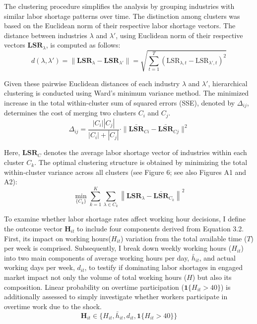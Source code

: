 \documentclass[
  12pt,
]{article}
\begin{document}
The clustering procedure simplifies the analysis by grouping industries
with similar labor shortage patterns over time. The distinction among
clusters was based on the Euclidean norm of their respective labor
shortage vectors. The distance between industries \(\lambda\) and
\(\lambda'\), using Euclidean norm of their respective vectors
\(\mathbf{LSR}_\lambda\), is computed as follows: \[
d\left( \lambda, \lambda' \right) = \| \mathbf{LSR}_\lambda - \mathbf{LSR}_{\lambda'} \| = \sqrt{ \sum_{t=1}^{T} \left( \text{LSR}_{\lambda,t} - \text{LSR}_{\lambda',t} \right)^2 }
\]

Given these pairwise Euclidean distances of each industry \(\lambda\)
and \(\lambda'\), hierarchical clustering is conducted using Ward's
minimum variance method. The minimized increase in the total
within-cluster sum of squared errors (SSE), denoted by \(\Delta_{ij}\),
determines the cost of merging two clusters \(C_i\) and \(C_j\). \[
\Delta_{ij}=\frac{|C_i||C_j|}{|C_i| + |C_j|} \cdot \| \mathbf{\bar{LSR}}_{Ci} - \mathbf{\bar{LSR}}_{Cj} \|^2
\]

Here, \(\mathbf{LSR}_C\) denotes the average labor shortage vector of
industries within each cluster \(C_k\). The optimal clustering structure
is obtained by minimizing the total within-cluster variance across all
clusters (see Figure 6; see also Figures A1 and A2): \[
\min_{\{C_k\}} \sum_{k=1}^{K} \sum_{\lambda \in C_k} \left\| \mathbf{LSR}_\lambda - \bar{\mathbf{LSR}}_{C_k} \right\|^2
\]

To examine whether labor shortage rates affect working hour decisions, I
define the outcome vector \(\mathbf{H}_{it}\) to include four components
derived from Equation 3.2. First, its impact on working
hours(\(H_{it}\)) variation from the total available time (\(T\)) per
week is comprised. Subsequently, I break down weekly working hours
(\(H_{it}\)) into two main components of average working hours per day,
\(\bar{h}_{it}\), and actual working days per week, \(d_{it}\), to
testify if dominating labor shortages in engaged market impact not only
the volume of total working hours (\(H\)) but also its composition.
Linear probability on overtime participation
(\(\mathbf{1}\{H_{it} > 40\}\)) is additionally assessed to simply
investigate whether workers participate in overtime work due to the
shock. \[
\mathbf{H}_{it} \in \{H_{it}, \bar{h}_{it}, d_{it}, \mathbf{1}\{H_{it} > 40\} \}
\]
\end{document}
